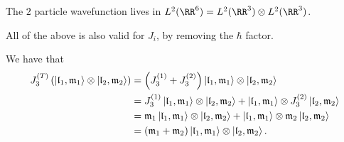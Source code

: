 \documentclass[12pt, a4paper]{article}
\begin{document}
\begin{mdnote}
    The \(2\) particle wavefunction lives in \(L^2(\RR^6) = L^2(\RR^3)\otimes L^2(\RR^3)\).
\end{mdnote}

\begin{mdnote}
    All of the above is also valid for \(J_i\), by removing the \(\hbar\) factor. 
\end{mdnote}

\begin{mdexample}
    We have that 
    \[\begin{aligned}
        J_3^{(T)} \left( \ket{\mathfrak{l}_1,\mathfrak{m}_1} \otimes \ket{\mathfrak{l}_2,\mathfrak{m}_2}\right) &= \left( J_3^{(1)}+J_3^{(2)}  \right) \ket{\mathfrak{l}_1,\mathfrak{m}_1} \otimes \ket{\mathfrak{l}_2,\mathfrak{m}_2} \\
        &=J_3^{(1)}\ket{\mathfrak{l}_1,\mathfrak{m}_1}\otimes\ket{\mathfrak{l}_2,\mathfrak{m}_2} + \ket{\mathfrak{l}_1,\mathfrak{m}_1} \otimes J_3^{(2)}\ket{\mathfrak{l}_2,\mathfrak{m}_2} \\
        &=\mathfrak{m}_1 \ket{\mathfrak{l}_1,\mathfrak{m}_1} \otimes \ket{\mathfrak{l}_2,\mathfrak{m}_2} + \ket{\mathfrak{l}_1,\mathfrak{m}_1} \otimes \mathfrak{m}_2\ket{\mathfrak{l}_2,\mathfrak{m}_2} \\
        &= (\mathfrak{m}_1+ \mathfrak{m}_2)\ket{\mathfrak{l}_1,\mathfrak{m}_1}\otimes\ket{\mathfrak{l}_2,\mathfrak{m}_2}.
    \end{aligned}\]
\end{mdexample}
\end{document}
